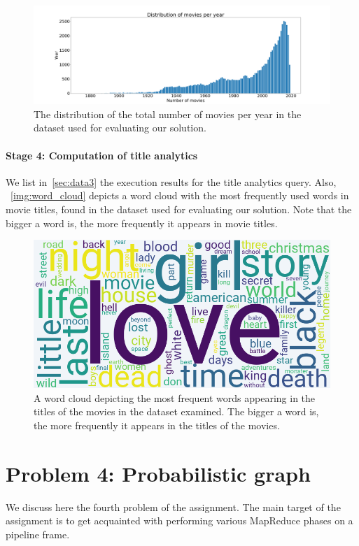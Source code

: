 \documentclass[acmlarge]{acmart}
\begin{document}
  \begin{figure}[tb!]
    \centering
    \includegraphics[width=\linewidth]{figures/movies per year}
    \caption{The distribution of the total number of movies per year in the dataset used for evaluating our solution.}
    \label{img:movies_per_year}
  \end{figure}

  \paragraph{Stage 4: Computation of title analytics}
  We list in~\autoref{sec:data3} the execution results for the title analytics query. Also, ~\autoref{img:word_cloud} depicts a word cloud with the most frequently used words in movie titles, found in the dataset used for evaluating our solution. Note that the bigger a word is, the more frequently it appears in movie titles.
  \begin{figure}[tb!]
    \centering
    \includegraphics[width=0.8\linewidth]{figures/word cloud}
    \caption{A word cloud depicting the most frequent words appearing in the titles of the movies in the dataset examined. The bigger a word is, the more frequently it appears in the titles of the movies.}
    \label{img:word_cloud}
  \end{figure}

  \section{Problem 4: Probabilistic graph}
  \label{sec:problem4}
  We discuss here the fourth problem of the assignment.
  The main target of the assignment is to get acquainted with performing various MapReduce phases on a pipeline frame.
\end{document}
